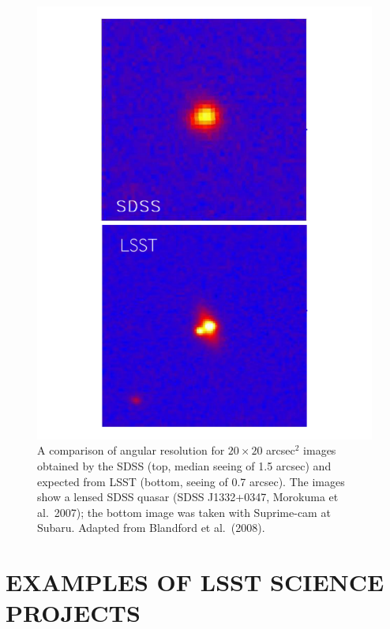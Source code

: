 \documentclass{emulateapj}
\begin{document}
\begin{figure}
\includegraphics[width=1.0\hsize,clip]{panels2.pdf}
\caption{A comparison of angular resolution for $20\times20$ arcsec$^2$ images obtained 
by the SDSS (top, median seeing of 1.5 arcsec) and expected from LSST (bottom,
seeing of 0.7 arcsec). The images show a lensed SDSS quasar (SDSS J1332+0347,
Morokuma et al.~2007); the bottom image was taken with Suprime-cam at Subaru. 
Adapted from Blandford et al.~(2008).} 
\label{Fig:panels2}
\end{figure}



\section{                EXAMPLES OF LSST SCIENCE PROJECTS                    }
\label{Sec:science}
\end{document}
